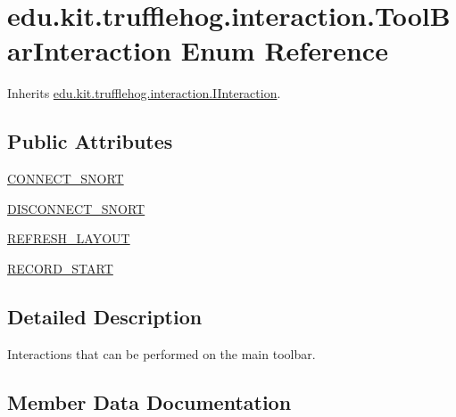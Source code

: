 \hypertarget{enumedu_1_1kit_1_1trufflehog_1_1interaction_1_1_tool_bar_interaction}{}\section{edu.\+kit.\+trufflehog.\+interaction.\+Tool\+Bar\+Interaction Enum Reference}
\label{enumedu_1_1kit_1_1trufflehog_1_1interaction_1_1_tool_bar_interaction}


Inherits \hyperlink{interfaceedu_1_1kit_1_1trufflehog_1_1interaction_1_1_i_interaction}{edu.\+kit.\+trufflehog.\+interaction.\+I\+Interaction}.

\subsection*{Public Attributes}
\begin{DoxyCompactItemize}
\item 
\hyperlink{enumedu_1_1kit_1_1trufflehog_1_1interaction_1_1_tool_bar_interaction_aad67b10d0838358627b53bb3a6dbf3bb}{C\+O\+N\+N\+E\+C\+T\+\_\+\+S\+N\+O\+R\+T}
\item 
\hyperlink{enumedu_1_1kit_1_1trufflehog_1_1interaction_1_1_tool_bar_interaction_a76eacf3dd6eb003bbc08f4b93bd73b52}{D\+I\+S\+C\+O\+N\+N\+E\+C\+T\+\_\+\+S\+N\+O\+R\+T}
\item 
\hyperlink{enumedu_1_1kit_1_1trufflehog_1_1interaction_1_1_tool_bar_interaction_a1fb519929d89408c9cb7283c230f0184}{R\+E\+F\+R\+E\+S\+H\+\_\+\+L\+A\+Y\+O\+U\+T}
\item 
\hyperlink{enumedu_1_1kit_1_1trufflehog_1_1interaction_1_1_tool_bar_interaction_a90b86b0dd98633c51385b361f17efccd}{R\+E\+C\+O\+R\+D\+\_\+\+S\+T\+A\+R\+T}
\end{DoxyCompactItemize}


\subsection{Detailed Description}
Interactions that can be performed on the main toolbar. 

\subsection{Member Data Documentation}
\hypertarget{enumedu_1_1kit_1_1trufflehog_1_1interaction_1_1_tool_bar_interaction_aad67b10d0838358627b53bb3a6dbf3bb}{}
